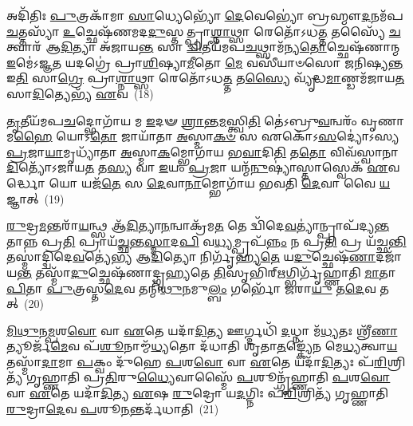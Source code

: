 𑌅𑌦𑌿᳴𑌤𑌿𑌃 \ul{𑌪𑍁}\-𑌤𑍍𑌰𑌕𑌾᳴𑌮𑌾 \ul{𑌸𑌾}\-𑌧𑍍𑌯𑍇𑌭𑍍𑌯𑍋᳴ \ul{𑌦𑍇}\-𑌵𑍇𑌭𑍍𑌯𑍋॑ 𑌬𑍍𑌰𑌹𑍍𑌮𑍗\-\ul{𑌦}\-𑌨𑌮᳴𑌪\-\ul{𑌚}\-𑌤𑍍𑌤𑌸𑍍𑌯𑌾᳴ \ul{𑌉}\-𑌚𑍍𑌛𑍇𑌷᳴𑌣𑌮𑌦\-\ul{𑌦𑍁}\-𑌸𑍍𑌤𑌤𑍍𑌪𑍍𑌰𑌾\-\ul{𑌶𑍍𑌨𑌾}\-𑌥𑍍𑌸𑌾 𑌰𑍇𑌤𑍋᳴\-𑌽𑌧\-\ul{𑌤𑍍𑌤} 𑌤𑌸𑍍𑌯𑍈᳴ \ul{𑌚}\-𑌤𑍍𑌵𑌾𑌰᳴ 𑌆\-\ul{𑌦𑌿}\-𑌤𑍍𑌯𑌾 𑌅᳴𑌜𑌾𑌯\-\ul{𑌨𑍍𑌤} 𑌸𑌾 \ul{𑌦𑍍𑌵𑌿}\-𑌤𑍀𑌯᳴𑌮𑌪\-\ul{𑌚}\-𑌥𑍍𑌸𑌾𑌮᳴𑌨𑍍𑌯\-\ul{𑌤𑍋}\-𑌚𑍍𑌛𑍇𑌷᳴𑌣𑌾𑌨𑍍𑌮 \ul{𑌇}\-𑌮𑍇॑\-𑌽𑌜𑍍𑌞\-\ul{𑌤} 𑌯𑌦𑌗𑍍𑌰𑍇॑ 𑌪𑍍𑌰𑌾\-\ul{𑌶𑌿}\-𑌷𑍍𑌯𑌾\-\ul{𑌮𑍀}\-𑌤𑍋 \ul{𑌮𑍇} 𑌵𑌸𑍀᳴𑌯𑌾𑍞𑌸𑍋 𑌜𑌨𑌿𑌷𑍍𑌯\-\ul{𑌨𑍍𑌤} 𑌇\-\ul{𑌤𑌿} 𑌸𑌾\-\ul{𑌗𑍍𑌰𑍇} 𑌪𑍍𑌰𑌾\-\ul{𑌶𑍍𑌨𑌾}\-𑌥𑍍𑌸𑌾 𑌰𑍇𑌤𑍋᳴\-𑌽𑌧\-\ul{𑌤𑍍𑌤} 𑌤\-\ul{𑌸𑍍𑌯𑍈} 𑌵𑍍𑌯𑍃᳴𑌦𑍍𑌧\-\ul{𑌮𑌾}\-𑌣𑍍𑌡𑌮᳴𑌜𑌾𑌯\-\ul{𑌤} 𑌸𑌾\-\ul{𑌦𑌿}\-𑌤𑍍𑌯𑍇𑌭𑍍𑌯᳴ \ul{𑌏}\-𑌵~(18)

\-\ul{𑌤𑍃}\-𑌤𑍀𑌯᳴𑌮𑌪\-\ul{𑌚}\-𑌦𑍍𑌭𑍋𑌗𑌾᳴𑌯 𑌮 \ul{𑌇}\-𑌦𑍟 \ul{𑌶𑍍𑌰𑌾}\-𑌨𑍍𑌤\-\ul{𑌮}\-𑌸𑍍𑌤𑍍𑌵𑌿\-\ul{𑌤𑌿} 𑌤𑍇॑\-𑌽𑌬𑍍𑌰𑍁\-\ul{𑌵}\-𑌨𑍍𑌵𑌰𑌂᳴ 𑌵𑍃𑌣𑌾𑌮\-\ul{𑌹𑍈} 𑌯𑍋\-𑌽\-\ul{𑌤𑍋} 𑌜𑌾𑌯𑌾᳴𑌤𑌾 \ul{𑌅}\-𑌸𑍍𑌮𑌾\-\ul{𑌕}\-\-\ul{𑍞} 𑌸 𑌏𑌕𑍋᳴\-𑌽\-\ul{𑌸}\-𑌦𑍍𑌯𑍋॑\-𑌽𑌸𑍍𑌯 \ul{𑌪𑍍𑌰}\-𑌜𑌾\-\ul{𑌯𑌾}\-𑌮𑍃𑌧𑍍𑌯𑌾᳴𑌤𑌾 \ul{𑌅}\-𑌸𑍍𑌮𑌾\-\ul{𑌕}\-𑌮𑍍𑌭𑍋𑌗𑌾᳴𑌯 𑌭\-\ul{𑌵𑌾}\-𑌦𑌿\-\ul{𑌤𑌿} 𑌤\-\ul{𑌤𑍋} 𑌵𑌿𑌵᳴𑌸𑍍𑌵𑌾𑌨𑌾\-\ul{𑌦𑌿}\-𑌤𑍍𑌯𑍋᳴\-𑌽𑌜𑌾𑌯\-\ul{𑌤} 𑌤\-\ul{𑌸𑍍𑌯} 𑌵𑌾 \ul{𑌇}\-𑌯𑌂 \ul{𑌪𑍍𑌰}\-𑌜𑌾 𑌯𑌨𑍍𑌮᳴\-\ul{𑌨𑍁}\-𑌷𑍍𑌯𑌾॑𑌸𑍍𑌤𑌾𑌸𑍍𑌵𑍇𑌕᳴ \ul{𑌏}\-𑌵𑌰𑍍𑌦𑍍𑌧𑍋 𑌯𑍋 𑌯𑌜᳴\-\ul{𑌤𑍇} 𑌸 \ul{𑌦𑍇}\-𑌵𑌾\-\ul{𑌨𑌾}\-𑌮𑍍𑌭𑍋𑌗𑌾᳴𑌯 𑌭𑌵𑌤𑌿 \ul{𑌦𑍇}\-𑌵𑌾 𑌵𑍈 \ul{𑌯}\-𑌜𑍍𑌞𑌾𑌤𑍍~(19)

\-\ul{𑌰𑍁}\-𑌦𑍍𑌰\-\ul{𑌮}\-𑌨𑍍𑌤𑌰𑌾᳴\-\ul{𑌯}\-𑌨𑍍𑌥𑍍𑌸 𑌆᳴\-\ul{𑌦𑌿}\-𑌤𑍍𑌯𑌾\-\ul{𑌨}\-𑌨𑍍𑌵𑌾𑌕𑍍𑌰᳴𑌮\-\ul{𑌤} 𑌤𑍇 𑌦𑍍𑌵𑌿᳴𑌦𑍇\-\ul{𑌵}\-𑌤𑍍𑌯𑌾॑𑌨𑍍𑌪𑍍𑌰𑌾𑌪᳴𑌦𑍍𑌯\-\ul{𑌨𑍍𑌤} 𑌤𑌾𑌨𑍍𑌨 𑌪𑍍𑌰\-\ul{𑌤𑌿} 𑌪𑍍𑌰𑌾𑌯᳴\-\ul{𑌚𑍍𑌛}\-𑌨𑍍𑌤\-\ul{𑌸𑍍𑌮𑌾}\-𑌦\-\ul{𑌪𑌿} 𑌵\-\ul{𑌧𑍍𑌯}\-𑌮𑍍𑌪𑍍𑌰𑌪᳴\-\ul{𑌨𑍍𑌨𑌂} 𑌨 𑌪𑍍𑌰\-\ul{𑌤𑌿} 𑌪𑍍𑌰 𑌯᳴𑌚𑍍𑌛\-\ul{𑌨𑍍𑌤𑌿} 𑌤𑌸𑍍𑌮𑌾॑𑌦𑍍𑌦𑍍𑌵𑌿𑌦𑍇\-\ul{𑌵}\-𑌤𑍍𑌯𑍇॑𑌭𑍍𑌯 𑌆\-\ul{𑌦𑌿}\-𑌤𑍍𑌯𑍋 𑌨𑌿𑌰𑍍𑌗𑍃᳴𑌹𑍍𑌯\-\ul{𑌤𑍇} 𑌯\-\ul{𑌦𑍁}\-𑌚𑍍𑌛𑍇𑌷᳴\-\ul{𑌣𑌾}\-𑌦𑌜𑌾᳴𑌯\-\ul{𑌨𑍍𑌤} 𑌤𑌸𑍍𑌮𑌾᳴\-\ul{𑌦𑍁}\-𑌚𑍍𑌛𑍇𑌷᳴𑌣𑌾𑌦𑍍𑌗𑍃𑌹𑍍𑌯𑌤𑍇 \ul{𑌤𑌿}\-𑌸𑍃𑌭𑌿᳴𑌰𑍍\mbox{}\-\ul{𑌋}\-𑌗𑍍𑌭𑌿𑌰𑍍𑌗𑍃᳴𑌹𑍍𑌣𑌾𑌤𑌿 \ul{𑌮𑌾}\-𑌤𑌾 \ul{𑌪𑌿}\-𑌤𑌾 \ul{𑌪𑍁}\-𑌤𑍍𑌰𑌸𑍍𑌤\-\ul{𑌦𑍇}\-𑌵 𑌤𑌨𑍍𑌮𑌿᳴\-\ul{𑌥𑍁}\-𑌨𑌮𑍁\-\ul{𑌲𑍍𑌬𑌂} 𑌗𑌰𑍍𑌭𑍋᳴ \ul{𑌜}\-𑌰𑌾\-\ul{𑌯𑍁} 𑌤\-\ul{𑌦𑍇}\-𑌵 𑌤𑌤𑍍~(20)

\-\ul{𑌮𑌿}\-\-\ul{𑌥𑍁}\-𑌨\-\ul{𑌮𑍍𑌪}\-𑌶\-\ul{𑌵𑍋} 𑌵𑌾 \ul{𑌏}\-𑌤𑍇 𑌯𑌦𑌾᳴\-\ul{𑌦𑌿}\-𑌤𑍍𑌯 𑌊𑌰𑍍𑌗𑍍𑌦𑌧𑌿᳴ \ul{𑌦}\-𑌧𑍍𑌨𑌾 𑌮᳴\-\ul{𑌧𑍍𑌯}\-𑌤𑌃 𑌶𑍍𑌰𑍀᳴\-\ul{𑌣𑌾}\-𑌤𑍍𑌯𑍂𑌰𑍍𑌜᳴\-\ul{𑌮𑍇}\-𑌵 𑌪᳴\-\ul{𑌶𑍂}\-𑌨𑌾𑌮𑍍𑌮᳴\-\ul{𑌧𑍍𑌯}\-𑌤𑍋 𑌦᳴𑌧𑌾𑌤𑌿 𑌶𑍃𑌤𑌾\-\ul{𑌤}\-𑌙𑍍𑌕𑍍𑌯𑍇᳴𑌨 𑌮𑍇\-\ul{𑌧𑍍𑌯}\-𑌤𑍍𑌵𑌾\-\ul{𑌯} 𑌤𑌸𑍍𑌮𑌾᳴\-\ul{𑌦𑌾}\-𑌮𑌾 \ul{𑌪}\-𑌕𑍍𑌵𑌂 𑌦𑍁᳴𑌹𑍇 \ul{𑌪}\-𑌶\-\ul{𑌵𑍋} 𑌵𑌾 \ul{𑌏}\-𑌤𑍇 𑌯𑌦𑌾᳴\-\ul{𑌦𑌿}\-𑌤𑍍𑌯𑌃 𑌪᳴\-\ul{𑌰𑌿}\-𑌶𑍍𑌰𑌿𑌤𑍍𑌯᳴ 𑌗𑍃𑌹𑍍𑌣𑌾𑌤𑌿 𑌪𑍍𑌰\-\ul{𑌤𑌿}\-𑌰𑍁\-\ul{𑌧𑍍𑌯𑍈}\-𑌵𑌾𑌸𑍍𑌮𑍈᳴ \ul{𑌪}\-𑌶𑍂𑌨𑍍𑌗𑍃᳴𑌹𑍍𑌣𑌾𑌤𑌿 \ul{𑌪}\-𑌶\-\ul{𑌵𑍋} 𑌵𑌾 \ul{𑌏}\-𑌤𑍇 𑌯𑌦𑌾᳴\-\ul{𑌦𑌿}\-𑌤𑍍𑌯 \ul{𑌏}\-𑌷 \ul{𑌰𑍁}\-𑌦𑍍𑌰𑍋 𑌯\-\ul{𑌦}\-𑌗𑍍𑌨𑌿𑌃 𑌪᳴\-\ul{𑌰𑌿}\-𑌶𑍍𑌰𑌿𑌤𑍍𑌯᳴ 𑌗𑍃𑌹𑍍𑌣𑌾𑌤𑌿 \ul{𑌰𑍁}\-𑌦𑍍𑌰𑌾\-\ul{𑌦𑍇}\-𑌵 \ul{𑌪}\-𑌶𑍂\-\ul{𑌨}\-𑌨𑍍𑌤𑌰𑍍𑌦᳴𑌧𑌾𑌤𑌿~(21)

